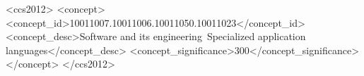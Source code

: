 \documentclass{sig-alternate-05-2015}
\newcommand{\cut}[1]{}
\begin{document}

\maketitle
\begin{abstract}
\end{abstract}


%
%
\begin{CCSXML}
<ccs2012>
<concept>
<concept_id>10011007.10011006.10011050.10011023</concept_id>
<concept_desc>Software and its engineering~Specialized application languages</concept_desc>
<concept_significance>300</concept_significance>
</concept>
</ccs2012>
\end{CCSXML}



%
%

%
%
\printccsdesc






% 
% 


\cut{
\section{Acknowledgments}
This section is optional; it is a location for you
to acknowledge grants, funding, editing assistance and
what have you.  In the present case, for example, the
authors would like to thank Gerald Murray of ACM for
his help in codifying this \textit{Author's Guide}
and the \textbf{.cls} and \textbf{.tex} files that it describes.
}

%

%
% 
\end{document}

